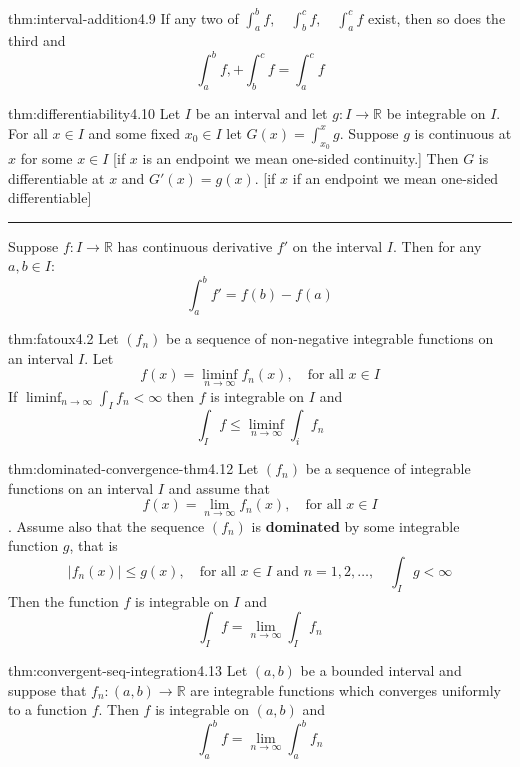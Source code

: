 \documentclass[landscape, 8pt]{extarticle}
\begin{document}
\begin{multicols}{3}
\begin{thm}{thm:interval-addition}{4.9}
	If any two of $\displaystyle\int_{a}^{b} f, \quad \int_{b}^{c} f, \quad \int_{a}^{c} f$
	exist, then so does the third and
	\[\int_{a}^{b} f, + \int_{b}^{c} f = \int_{a}^{c} f\]
\end{thm}

\begin{thm}{thm:differentiability}{4.10}
	Let $I$ be an interval and let $g : I \to \mathbb{R}$ be integrable on $I$. For all $x\in I$ and some fixed $x_{0}\in I$ let $G(x) = \int_{x_{0}}^{x}g$. Suppose $g$ is continuous at $x$ for some $x\in I$ [if $x$ is an endpoint we mean one-sided continuity.] Then $G$ is differentiable at $x$ and $G'(x) = g(x)$. [if $x$ if an endpoint we mean one-sided differentiable]

	\noindent\rule{\textwidth}{0.2pt}
	Suppose $f : I \to \mathbb{R}$ has continuous derivative $f'$ on the interval $I$. Then for any $a, b\in I$:
	\[\int_{a}^{b} f' = f(b) - f(a) \]
\end{thm}

\begin{lma}{thm:fatoux}{4.2}
	Let $(f_{n})$ be a sequence of non-negative integrable functions on an interval $I$. Let
	\[f(x) = \liminf_{n\to \infty} f_{n}(x),\quad\text{for all $x\in I$}\]
	If $\liminf_{n\to \infty}\int_{I} f_{n} < \infty$ then $f$ is integrable on $I$ and
	\[\int_{I} f \le \liminf_{n\to \infty}\int_{i} f_{n}\]
\end{lma}

\begin{thm}{thm:dominated-convergence-thm}{4.12}
	Let $(f_{n})$ be a sequence of integrable functions on an interval $I$ and assume that
	\[f(x) = \lim_{n\to \infty} f_{n}(x), \quad \text{for all $x\in I$}\].
	Assume also that the sequence $(f_{n})$ is \textbf{dominated} by some integrable function $g$, that is
	\[\lvert f_{n}(x) \rvert \le g(x),\quad \text{for all $x\in I$ and $n = 1,2,\dots,$} \quad \int_{I} g < \infty\]
	Then the function $f$ is integrable on $I$ and
	\[\int_{I} f = \lim_{n\to \infty} \int_{I} f_{n}\]
\end{thm}

\begin{thm}[]{thm:convergent-seq-integration}{4.13}
	Let $(a, b)$ be a bounded interval and suppose that $f_{n} : (a, b) \to \mathbb{R}$ are integrable functions which converges uniformly to a function $f$. Then $f$ is integrable on $(a, b)$ and
	\[\int_{a}^{b} f = \lim_{n\to \infty} \int_{a}^{b} f_{n} \]
\end{thm}


\end{multicols}
\end{document}
